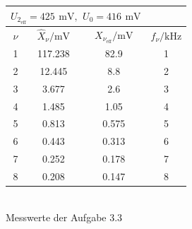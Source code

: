 \documentclass[a4paper, 12pt]{article}
\begin{document}
  \subsection{}

  \begin{center}
    \bgroup
    \def\arraystretch{1.6180339887498948}
      \begin{tabular}{@{}cccc@{}}
      \toprule
      \multicolumn{3}{c}{$U_{2_{\text{eff}}}=425
      \,\ \si{\milli\volt}, \,\ U_0 = 416 \,\ \si{\milli\volt}$} \\ \midrule
      $\nu$      & $\hat{X}_\nu / \si{\milli\volt}$   & $X_{\nu_{\text{eff}}} / \si{\milli\volt}$ & $f_\nu / \si{\kilo\hertz}$ \\ \hline
      1 & 117.238 & 82.9        & 1        \\
      2 & 12.445  & 8.8         & 2        \\
      3 & 3.677   & 2.6         & 3        \\
      4 & 1.485   & 1.05        & 4        \\
      5 & 0.813   & 0.575       & 5        \\
      6 & 0.443   & 0.313       & 6        \\
      7 & 0.252   & 0.178       & 7        \\
      8 & 0.208   & 0.147       & 8        \\ \bottomrule
      \end{tabular}\\
      Messwerte der Aufgabe 3.3\\
      \egroup
    \end{center}
\end{document}
